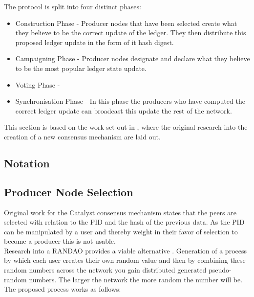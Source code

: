 \documentclass{article}
\begin{document}
The protocol is split into four distinct phases:

\begin{itemize}

\item Construction Phase - Producer nodes that have been selected create what they believe to be the correct update of the ledger. They then distribute this proposed ledger update in the form of it hash digest.
\item Campaigning Phase - Producer nodes designate and declare what they believe to be the most popular ledger state update.
\item Voting Phase -
\item Synchronisation Phase - In this phase the producers who have computed the correct ledger update can broadcast this update the rest of the network.

\end{itemize}

This section is based on the work set out in \cite{catalystresearch}, where the original research into the creation of a new consensus mechanism are laid out.

\subsection{Notation}

\subsection{Producer Node Selection}



Original work for the Catalyst consensus mechanism states that the peers are selected with relation to the PID and the hash of the previous data. As the PID can be manipulated by a user and thereby weight in their favor of selection to become a producer this is not usable. \\

Research into a RANDAO provides a viable alternative \cite{skvorc}\cite{randao}. Generation of a process by which each user creates their own random value and then by combining these random numbers across the network you gain distributed generated pseudo-random numbers. The larger the network the more random the number will be. The proposed process works as follows: \\
\end{document}
